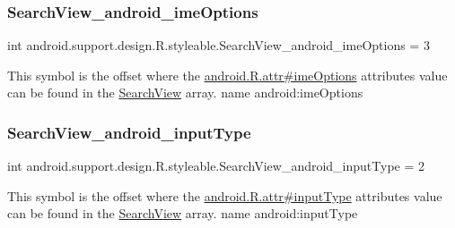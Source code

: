 \subsubsection{\texorpdfstring{Search\+View\+\_\+android\+\_\+ime\+Options}{SearchView\_android\_imeOptions}}
{\footnotesize\ttfamily int android.\+support.\+design.\+R.\+styleable.\+Search\+View\+\_\+android\+\_\+ime\+Options = 3\hspace{0.3cm}{\ttfamily [static]}}

This symbol is the offset where the \hyperlink{}{android.\+R.\+attr\#ime\+Options} attribute\textquotesingle{}s value can be found in the \hyperlink{classandroid_1_1support_1_1design_1_1R_1_1styleable_a8f7e72dc1bf854e14c1be7dbc1cb7392}{Search\+View} array.  name android\+:ime\+Options \mbox{\label{classandroid_1_1support_1_1design_1_1R_1_1styleable_ade6584fc0075b1b9f4eb7d962b817198}} 
\subsubsection{\texorpdfstring{Search\+View\+\_\+android\+\_\+input\+Type}{SearchView\_android\_inputType}}
{\footnotesize\ttfamily int android.\+support.\+design.\+R.\+styleable.\+Search\+View\+\_\+android\+\_\+input\+Type = 2\hspace{0.3cm}{\ttfamily [static]}}

This symbol is the offset where the \hyperlink{}{android.\+R.\+attr\#input\+Type} attribute\textquotesingle{}s value can be found in the \hyperlink{classandroid_1_1support_1_1design_1_1R_1_1styleable_a8f7e72dc1bf854e14c1be7dbc1cb7392}{Search\+View} array.  name android\+:input\+Type \mbox{\label{classandroid_1_1support_1_1design_1_1R_1_1styleable_ab62fc7eb5b7b2bc25ef503ebe25dc42b}} 
